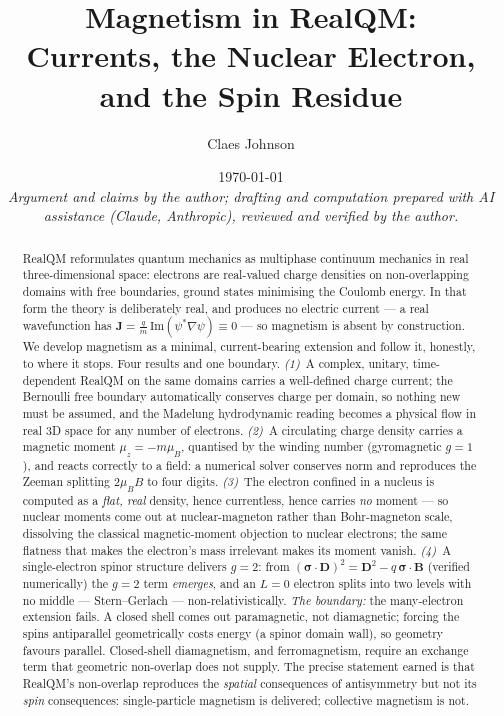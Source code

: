 \documentclass[11pt]{article}
\title{Magnetism in RealQM:\\
Currents, the Nuclear Electron, and the Spin Residue}
\author[1]{Claes Johnson}
\affil[1]{KTH Royal Institute of Technology, SE-100 44 Stockholm, Sweden \\
\texttt{claesjohnson@gmail.com}}
\date{\today \\[0.4em]
\small\textit{Argument and claims by the author; drafting and computation prepared with AI assistance (Claude, Anthropic), reviewed and verified by the author.}}
\begin{document}
\maketitle

\begin{abstract}
RealQM reformulates quantum mechanics as multiphase continuum mechanics in real three-dimensional space:
electrons are real-valued charge densities on non-overlapping domains with free boundaries, ground states
minimising the Coulomb energy. In that form the theory is deliberately real, and produces no electric
current --- a real wavefunction has $\mathbf J=\frac{q}{m}\,\mathrm{Im}(\psi^*\nabla\psi)\equiv 0$ --- so
magnetism is absent by construction. We develop magnetism as a minimal, current-bearing extension and
follow it, honestly, to where it stops. Four results and one boundary. \emph{(1)}~A complex,
unitary, time-dependent RealQM on the same domains carries a well-defined charge current; the Bernoulli
free boundary automatically conserves charge per domain, so nothing new must be assumed, and the Madelung
hydrodynamic reading becomes a physical flow in real 3D space for any number of electrons. \emph{(2)}~A
circulating charge density carries a magnetic moment $\mu_z=-m\mu_B$, quantised by the winding number
(gyromagnetic $g=1$), and reacts correctly to a field: a numerical solver conserves norm and reproduces
the Zeeman splitting $2\mu_B B$ to four digits. \emph{(3)}~The electron confined in a nucleus is computed
as a \emph{flat, real} density, hence currentless, hence carries \emph{no} moment --- so nuclear moments
come out at nuclear-magneton rather than Bohr-magneton scale, dissolving the classical magnetic-moment
objection to nuclear electrons; the same flatness that makes the electron's mass irrelevant makes its
moment vanish. \emph{(4)}~A single-electron spinor structure delivers $g=2$: from
$(\boldsymbol\sigma\cdot\mathbf D)^2=\mathbf D^2-q\,\boldsymbol\sigma\cdot\mathbf B$ (verified
numerically) the $g=2$ term \emph{emerges}, and an $L=0$ electron splits into two levels with no middle
--- Stern--Gerlach --- non-relativistically. \emph{The boundary:} the many-electron extension fails.
A closed shell comes out paramagnetic, not diamagnetic; forcing the spins antiparallel geometrically
costs energy (a spinor domain wall), so geometry favours parallel. Closed-shell diamagnetism, and
ferromagnetism, require an exchange term that geometric non-overlap does not supply. The precise
statement earned is that RealQM's non-overlap reproduces the \emph{spatial} consequences of antisymmetry
but not its \emph{spin} consequences: single-particle magnetism is delivered; collective magnetism is not.
\end{abstract}
\end{document}
